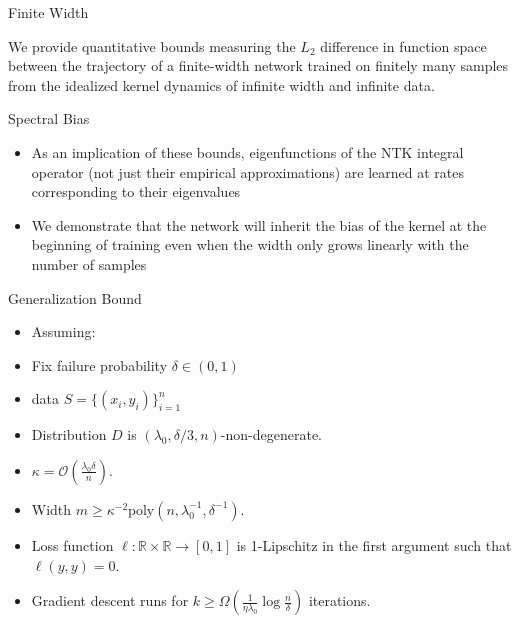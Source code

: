 \documentclass[serif, aspectratio=169]{beamer}
\begin{document}
\begin{frame}{Finite Width}
	
We provide quantitative bounds measuring the \(L_
2\) difference in function space between the trajectory of a finite-width network trained on finitely many samples from the idealized kernel dynamics
of infinite width and infinite data.
	
\end{frame}


\begin{frame}{Spectral Bias}
	\begin{itemize}

	\item As an implication of these bounds, eigenfunctions of the NTK integral operator (not just their empirical approximations) are learned at rates corresponding to their eigenvalues
	 
	\item We demonstrate that the network will inherit the bias of the kernel at the beginning of training
	even when the width only grows linearly with the number of samples
	
	\end{itemize}
\end{frame}





\begin{frame}{Generalization Bound}


\begin{itemize}
	\item Assuming:
		\item Fix failure probability \(\delta \in (0,1)\)
		\item data \(S = \{(x_i,y_i)\}_{i=1}^n\)
		\item Distribution \( D \) is \( (\lambda_0, \delta/3, n) \)-non-degenerate.
		\item \( \kappa = \mathcal{O}\left( \frac{\lambda_0 \delta}{n} \right) \).
		\item Width \( m \geq \kappa^{-2} \text{poly}(n, \lambda_0^{-1}, \delta^{-1}) \).
		\item Loss function \( \ell: \mathbb{R} \times \mathbb{R} \to [0, 1] \) is 1-Lipschitz in the first
		argument such that \( \ell(y, y) = 0 \).
		\item Gradient descent runs for \( k \geq \Omega\left( \frac{1}{\eta \lambda_0} \log \frac{n}{\delta} \right) \) iterations.
	

\end{itemize}

\end{frame}
\end{document}
